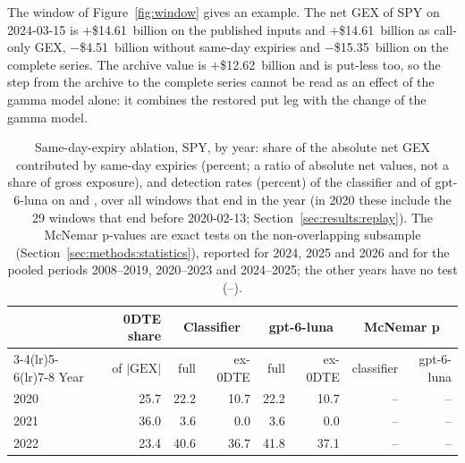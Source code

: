 The window of Figure~\ref{fig:window} gives an example. The net GEX of SPY on 2024-03-15 is $+$\$14.61~billion on the published inputs and $+$\$14.61~billion as call-only GEX, $-$\$4.51~billion without same-day expiries and $-$\$15.35~billion on the complete series. The archive value is $+$\$12.62~billion and is put-less too, so the step from the archive to the complete series cannot be read as an effect of the gamma model alone: it combines the restored put leg with the change of the gamma model.

\begin{table}[H]
\centering
\caption{Same-day-expiry ablation, SPY, by year: share of the absolute net GEX contributed by same-day expiries (percent; a ratio of absolute net values, not a share of gross exposure), and detection rates (percent) of the classifier and of gpt-6-luna on  and , over all windows that end in the year (in 2020 these include the 29 windows that end before 2020-02-13; Section~\ref{sec:results:replay}). The McNemar p-values are exact tests on the non-overlapping subsample (Section~\ref{sec:methods:statistics}), reported for 2024, 2025 and 2026 and for the pooled periods 2008--2019, 2020--2023 and 2024--2025; the other years have no test (--).}
\label{tab:ablation}
\footnotesize
\begin{tabular}{@{}lrrrrrrr@{}}
\toprule
 & 0DTE share & \multicolumn{2}{c}{Classifier} & \multicolumn{2}{c}{gpt-6-luna} & \multicolumn{2}{c}{McNemar p} \\
\cmidrule(lr){3-4}\cmidrule(lr){5-6}\cmidrule(lr){7-8}
Year & of $|\mathrm{GEX}|$ & full & ex-0DTE & full & ex-0DTE & classifier & gpt-6-luna \\
\midrule
2020 & 25.7 & 22.2 & 10.7 & 22.2 & 10.7 & -- & -- \\
2021 & 36.0 & 3.6 & 0.0 & 3.6 & 0.0 & -- & -- \\
2022 & 23.4 & 40.6 & 36.7 & 41.8 & 37.1 & -- & -- \\

\end{tabular}
\end{table}
